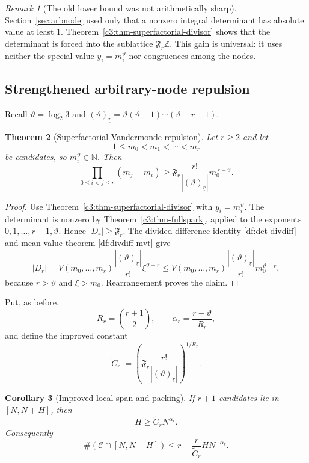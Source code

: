 \documentclass[11pt,oneside]{article}
\newtheorem{theorem}{Theorem}[section]
\newtheorem{corollary}[theorem]{Corollary}
\theoremstyle{definition}
\theoremstyle{remark}
\newtheorem{remark}[theorem]{Remark}
\newcommand{\N}{\mathbb N}
\newcommand{\Z}{\mathbb Z}
\newcommand{\thetaq}{\vartheta}
\newcommand{\Cand}{\mathcal C}
\newcommand{\fall}[2]{\left(#1\right)_{\!\underline{#2}}}
\newcommand{\SF}[1]{\mathfrak F_{#1}}
\begin{document}
\begin{remark}[The old lower bound was not arithmetically sharp]
Section~\ref{sec:arbnode} used only that a nonzero integral determinant has absolute value at
least $1$.  Theorem~\ref{c3:thm-superfactorial-divisor} shows that the determinant is forced
into the sublattice $\SF{r}\Z$.  This gain is universal: it uses neither the special value
$y_i=m_i^{\thetaq}$ nor congruences among the nodes.
\end{remark}

\subsection{Strengthened arbitrary-node repulsion}

Recall $\thetaq=\log_2 3$ and
$\fall{\thetaq}{r}=\thetaq(\thetaq-1)\cdots(\thetaq-r+1)$.

\begin{theorem}[Superfactorial Vandermonde repulsion]
\label{c3:thm-super-repulsion}
Let $r\ge2$ and let
\[
 1\le m_0<m_1<\cdots<m_r
\]
be candidates, so $m_i^{\thetaq}\in\N$.  Then
\begin{equation}
 \prod_{0\le i<j\le r}(m_j-m_i)
 \ge
 \SF{r}\frac{r!}{|\fall{\thetaq}{r}|}
 m_0^{\,r-\thetaq}.
 \label{c3:eq-super-repulsion}
\end{equation}
\end{theorem}

\begin{proof}
Use Theorem~\ref{c3:thm-superfactorial-divisor} with $y_i=m_i^{\thetaq}$.  The determinant is
nonzero by Theorem~\ref{c3:thm-fullspark}, applied to the exponents
$0,1,\ldots,r-1,\thetaq$.  Hence $|D_r|\ge\SF{r}$.  The divided-difference identity
\eqref{df:det-divdiff} and mean-value theorem \eqref{df:divdiff-mvt} give
\[
 |D_r|
 =V(m_0,\ldots,m_r)
   \frac{|\fall{\thetaq}{r}|}{r!}\xi^{\thetaq-r}
 \le
 V(m_0,\ldots,m_r)
   \frac{|\fall{\thetaq}{r}|}{r!}m_0^{\thetaq-r},
\]
because $r>\thetaq$ and $\xi>m_0$.  Rearrangement proves the claim.
\end{proof}

Put, as before,
\[
 R_r=\binom{r+1}{2},
 \qquad
 \alpha_r=\frac{r-\thetaq}{R_r},
\]
and define the improved constant
\begin{equation}
 \widetilde C_r:=
 \left(\SF{r}\frac{r!}{|\fall{\thetaq}{r}|}\right)^{1/R_r}.
 \label{c3:eq-Ctilde}
\end{equation}

\begin{corollary}[Improved local span and packing]
\label{c3:cor-super-span}
If $r+1$ candidates lie in $[N,N+H]$, then
\begin{equation}
 H\ge\widetilde C_rN^{\alpha_r}.
 \label{c3:eq-super-span}
\end{equation}
Consequently
\begin{equation}
 \#(\Cand\cap[N,N+H])
 \le r+\frac{r}{\widetilde C_r}HN^{-\alpha_r}.
 \label{c3:eq-super-count}
\end{equation}
\end{corollary}
\end{document}
